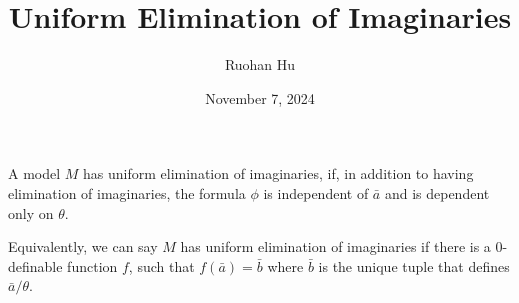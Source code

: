 \documentclass[a4paper]{article}
\title{Uniform Elimination of Imaginaries}
\date{November 7, 2024}
\author{Ruohan Hu}
\begin{document}
\maketitle
\par{
    A model \(M\) has uniform elimination of imaginaries, if, in addition to having elimination of imaginaries, the formula \(\phi\) is independent of \(\bar {a}\) and is dependent only on \(\theta\). 
    
    Equivalently, we can say $M$ has uniform elimination of imaginaries if there is a $0$-definable function \(f\), such that \(f( \bar {a})= \bar {b}\) where \(\bar {b}\) is the unique tuple that defines \(\bar {a}/ \theta\).
}
\printbibliography
\end{document}
